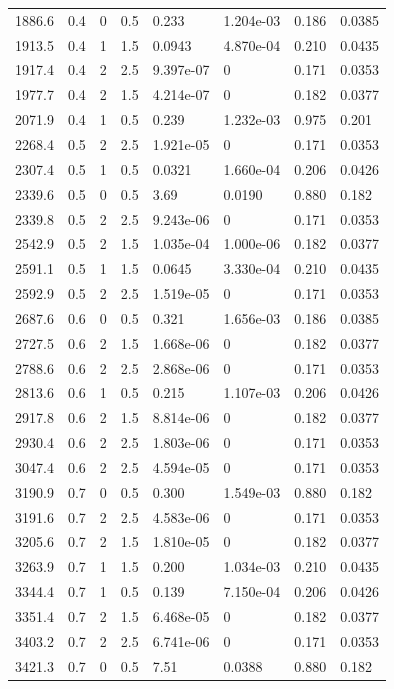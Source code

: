 \documentclass[preview]{standalone}
\begin{document}
{{\begin{tabular}{L{1.2cm}C{1.2cm} C{0.3cm}C{0.5cm} C{1.4cm}C{1.4cm} C{1.4cm}C{1.4cm}}
  1886.6  &   0.4  & 0     & 0.5 &  0.233  & 1.204e-03  & 0.186 &  0.0385   \\ 
  1913.5  &   0.4  & 1     & 1.5 &  0.0943  & 4.870e-04  & 0.210 &  0.0435   \\ 
  1917.4  &   0.4  & 2     & 2.5 &  9.397e-07  & 0  & 0.171 &  0.0353   \\ 
  1977.7  &   0.4  & 2     & 1.5 &  4.214e-07  & 0  & 0.182 &  0.0377   \\ 
  2071.9  &   0.4  & 1     & 0.5 &  0.239  & 1.232e-03  & 0.975 &  0.201   \\ 
  2268.4  &   0.5  & 2     & 2.5 &  1.921e-05  & 0  & 0.171 &  0.0353   \\ 
  2307.4  &   0.5  & 1     & 0.5 &  0.0321  & 1.660e-04  & 0.206 &  0.0426   \\ 
  2339.6  &   0.5  & 0     & 0.5 &  3.69  & 0.0190  & 0.880 &  0.182   \\ 
  2339.8  &   0.5  & 2     & 2.5 &  9.243e-06  & 0  & 0.171 &  0.0353   \\ 
  2542.9  &   0.5  & 2     & 1.5 &  1.035e-04  & 1.000e-06  & 0.182 &  0.0377   \\ 
  2591.1  &   0.5  & 1     & 1.5 &  0.0645  & 3.330e-04  & 0.210 &  0.0435   \\ 
  2592.9  &   0.5  & 2     & 2.5 &  1.519e-05  & 0  & 0.171 &  0.0353   \\ 
  2687.6  &   0.6  & 0     & 0.5 &  0.321  & 1.656e-03  & 0.186 &  0.0385   \\ 
  2727.5  &   0.6  & 2     & 1.5 &  1.668e-06  & 0  & 0.182 &  0.0377   \\ 
  2788.6  &   0.6  & 2     & 2.5 &  2.868e-06  & 0  & 0.171 &  0.0353   \\ 
  2813.6  &   0.6  & 1     & 0.5 &  0.215  & 1.107e-03  & 0.206 &  0.0426   \\ 
  2917.8  &   0.6  & 2     & 1.5 &  8.814e-06  & 0  & 0.182 &  0.0377   \\ 
  2930.4  &   0.6  & 2     & 2.5 &  1.803e-06  & 0  & 0.171 &  0.0353   \\ 
  3047.4  &   0.6  & 2     & 2.5 &  4.594e-05  & 0  & 0.171 &  0.0353   \\ 
  3190.9  &   0.7  & 0     & 0.5 &  0.300  & 1.549e-03  & 0.880 &  0.182   \\ 
  3191.6  &   0.7  & 2     & 2.5 &  4.583e-06  & 0  & 0.171 &  0.0353   \\ 
  3205.6  &   0.7  & 2     & 1.5 &  1.810e-05  & 0  & 0.182 &  0.0377   \\ 
  3263.9  &   0.7  & 1     & 1.5 &  0.200  & 1.034e-03  & 0.210 &  0.0435   \\ 
  3344.4  &   0.7  & 1     & 0.5 &  0.139  & 7.150e-04  & 0.206 &  0.0426   \\ 
  3351.4  &   0.7  & 2     & 1.5 &  6.468e-05  & 0  & 0.182 &  0.0377   \\ 
  3403.2  &   0.7  & 2     & 2.5 &  6.741e-06  & 0  & 0.171 &  0.0353   \\ 
  3421.3  &   0.7  & 0     & 0.5 &  7.51  & 0.0388  & 0.880 &  0.182   \\ 
\hline 
\end{tabular} 

}}
\end{document}
